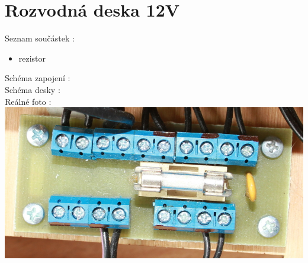 \section{Rozvodná deska 12V} 


Seznam součástek :

\begin{itemize}
	\item rezistor
\end{itemize} 

Schéma zapojení :\\

Schéma desky :\\

Reálné foto :\\

\includegraphics[scale=0.4]{./circuit_boards/img/real/rozvod_12V.JPG}